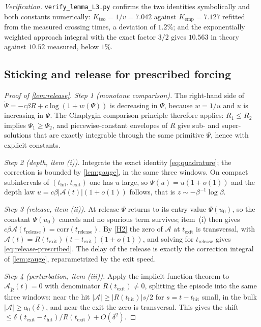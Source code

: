 \documentclass[11pt]{article}
\theoremstyle{definition}
\theoremstyle{remark}
\newcommand{\thit}{t_{\mathrm{hit}}}
\newcommand{\texit}{t_{\mathrm{exit}}}
\newcommand{\trel}{t_{\mathrm{release}}}
\newcommand{\Ar}{\mathcal{A}}                      %
\begin{document}
\noindent\emph{Verification.} \texttt{verify\_lemma\_L3.py} confirms the two
identities symbolically and both constants numerically:
$K_{\mathrm{teo}}=1/v=7.042$ against $K_{\mathrm{emp}}=7.127$ refitted from the
measured crossing times, a deviation of $1.2\%$; and the exponentially weighted
approach integral with the exact factor $3/2$ gives $10.563$ in theory against
$10.52$ measured, below $1\%$.

\subsection{Sticking and release for prescribed forcing}\label{app:L4}

\begin{proof}[Proof of \cref{lem:release}]
\emph{Step 1 (monotone comparison).} The right-hand side of
$\dot\Psi=-c\beta R+c\log(1+w(\Psi))$ is decreasing in $\Psi$, because $w=1/u$
and $u$ is increasing in $\Psi$. The Chaplygin comparison principle therefore
applies: $R_1\le R_2$ implies $\Psi_1\ge\Psi_2$, and piecewise-constant envelopes
of $R$ give sub- and super-solutions that are exactly integrable through the same
primitive $\Psi$, hence with explicit constants.

\emph{Step 2 (depth, item (i)).} Integrate the exact identity
\eqref{eq:quadrature}; the correction is bounded by \cref{lem:gauge}, in the same
three windows. On compact subintervals of $(\thit,\texit)$ one has $u$ large, so
$\Psi(u)=u(1+o(1))$ and the depth law $u=c\beta|\Ar(t)|(1+o(1))$ follows, that is
$z\sim-\beta^{-1}\log\beta$.

\emph{Step 3 (release, item (ii)).} At release $\Psi$ returns to its entry value
$\Psi(u_0)$, so the constant $\Psi(u_0)$ cancels and no spurious term survives;
item~(i) then gives $c\beta\Ar(\trel)=\mathrm{corr}(\trel)$. By \eqref{H2} the
zero of $\Ar$ at $\texit$ is transversal, with
$\Ar(t)=R(\texit)(t-\texit)(1+o(1))$, and solving for $\trel$ gives
\eqref{eq:release-prescribed}. The delay of the release is exactly the correction
integral of \cref{lem:gauge}, reparametrized by the exit speed.

\emph{Step 4 (perturbation, item (iii)).} Apply the implicit function theorem to
$\Ar_{\tilde R}(t)=0$ with denominator $R(\texit)\ne0$, splitting the episode into
the same three windows: near the hit $|\Ar|\ge|R(\thit)|s/2$ for $s=t-\thit$
small, in the bulk $|\Ar|\ge a_0(\delta)$, and near the exit the zero is
transversal. This gives the shift
$\le\delta\,(\texit-\thit)/R(\texit)+O(\delta^{2})$.
\end{proof}
\end{document}
